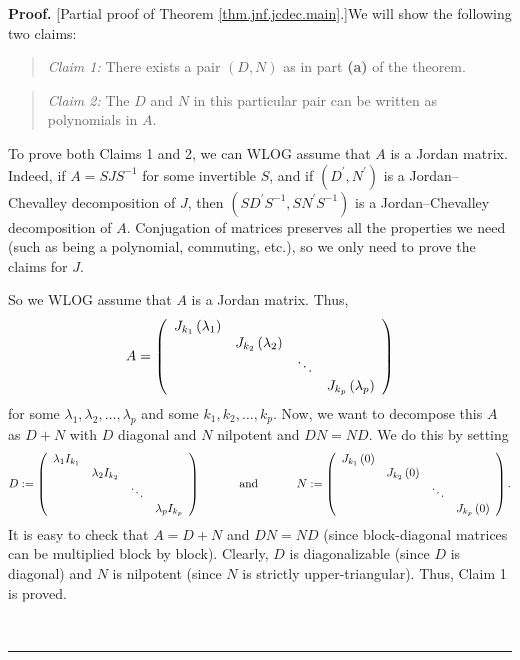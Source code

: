 \documentclass[numbers=enddot,12pt,final,onecolumn,notitlepage]{scrartcl}%
\numberwithin{exer}{subsection}
\theoremstyle{definition}
\newenvironment{statement}{\begin{quote}}{\end{quote}}
\newenvironment{proof}[1][Proof]{\noindent\textbf{#1.} }{\ \rule{0.5em}{0.5em}}
\begin{document}
\begin{proof}
[Partial proof of Theorem \ref{thm.jnf.jcdec.main}.]We will show the following
two claims:

\begin{statement}
\textit{Claim 1:} There exists a pair $\left(  D,N\right)  $ as in part
\textbf{(a)} of the theorem.
\end{statement}

\begin{statement}
\textit{Claim 2:} The $D$ and $N$ in this particular pair can be written as
polynomials in $A$.
\end{statement}

To prove both Claims 1 and 2, we can WLOG assume that $A$ is a Jordan matrix.
Indeed, if $A=SJS^{-1}$ for some invertible $S$, and if $\left(  D^{\prime
},N^{\prime}\right)  $ is a Jordan--Chevalley decomposition of $J$, then
$\left(  SD^{\prime}S^{-1},SN^{\prime}S^{-1}\right)  $ is a Jordan--Chevalley
decomposition of $A$. Conjugation of matrices preserves all the properties we
need (such as being a polynomial, commuting, etc.), so we only need to prove
the claims for $J$.

So we WLOG assume that $A$ is a Jordan matrix. Thus,%
\[
A=\left(
\begin{array}
[c]{cccc}%
J_{k_{1}}\left(  \lambda_{1}\right)  &  &  & \\
& J_{k_{2}}\left(  \lambda_{2}\right)  &  & \\
&  & \ddots & \\
&  &  & J_{k_{p}}\left(  \lambda_{p}\right)
\end{array}
\right)
\]
for some $\lambda_{1},\lambda_{2},\ldots,\lambda_{p}$ and some $k_{1}%
,k_{2},\ldots,k_{p}$. Now, we want to decompose this $A$ as $D+N$ with $D$
diagonal and $N$ nilpotent and $DN=ND$. We do this by setting%
\[
D:=\left(
\begin{array}
[c]{cccc}%
\lambda_{1}I_{k_{1}} &  &  & \\
& \lambda_{2}I_{k_{2}} &  & \\
&  & \ddots & \\
&  &  & \lambda_{p}I_{k_{p}}%
\end{array}
\right)  \ \ \ \ \ \ \ \ \ \ \text{and}\ \ \ \ \ \ \ \ \ \ N:=\left(
\begin{array}
[c]{cccc}%
J_{k_{1}}\left(  0\right)  &  &  & \\
& J_{k_{2}}\left(  0\right)  &  & \\
&  & \ddots & \\
&  &  & J_{k_{p}}\left(  0\right)
\end{array}
\right)  .
\]
It is easy to check that $A=D+N$ and $DN=ND$ (since block-diagonal matrices
can be multiplied block by block). Clearly, $D$ is diagonalizable (since $D$
is diagonal) and $N$ is nilpotent (since $N$ is strictly upper-triangular).
Thus, Claim 1 is proved.


\end{proof}
\end{document}
